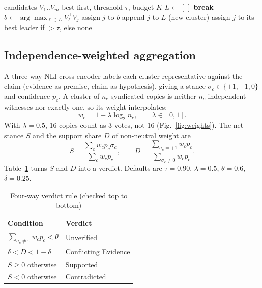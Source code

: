 \documentclass[conference,a4paper]{IEEEtran}
\begin{document}
\begin{algorithm}[!t]
\caption{Retrieve-wide leader clustering}
\label{alg:cluster}
\footnotesize
\begin{algorithmic}[1]
\Require candidates $V_1..V_m$ best-first, threshold $\tau$, budget $K$
\State $L \gets [\,]$ 
   \textbf{break} \EndIf
  \State $b \gets \arg\max_{\ell\in L} V_\ell^\top V_j$ 
   assign $j$ to $b$
  \Else{} append $j$ to $L$ (new cluster) \EndIf
\EndFor
{} assign $j$ to its best leader if $>\tau$, else none \EndFor
\end{algorithmic}
\end{algorithm}

\subsection{Independence-weighted aggregation}
\label{sec:agg}
A three-way NLI cross-encoder labels each cluster representative against the claim (evidence as premise, claim as
hypothesis), giving a stance $\sigma_c\in\{+1,-1,0\}$ and confidence $p_c$. A cluster of $n_c$ syndicated copies is
neither $n_c$ independent witnesses nor exactly one, so its weight interpolates:
\begin{equation}
  w_c = 1 + \lambda\log_2 n_c,\qquad \lambda\in[0,1].
\end{equation}
With $\lambda=0.5$, 16 copies count as 3 votes, not 16 (Fig.~\ref{fig:weights}). The net stance $S$ and the support
share $D$ of non-neutral weight are
\begin{equation}
  S = \frac{\sum_c w_c p_c \sigma_c}{\sum_c w_c p_c},\qquad
  D = \frac{\sum_{\sigma_c=+1} w_c p_c}{\sum_{\sigma_c\neq 0} w_c p_c}.
\end{equation}
Table~\ref{tab:verdict} turns $S$ and $D$ into a verdict. Defaults are $\tau=0.90$, $\lambda=0.5$, $\theta=0.6$,
$\delta=0.25$.

\begin{table}[!t]
\caption{Four-way verdict rule (checked top to bottom)}
\label{tab:verdict}
\centering\footnotesize
\begin{tabular}{ll}
\toprule
\textbf{Condition} & \textbf{Verdict}\\
\midrule
$\sum_{\sigma_c\neq0} w_c p_c < \theta$ & Unverified\\
$\delta < D < 1-\delta$ & Conflicting Evidence\\
$S \ge 0$ otherwise & Supported\\
$S < 0$ otherwise & Contradicted\\
\bottomrule
\end{tabular}
\end{table}
\end{document}
